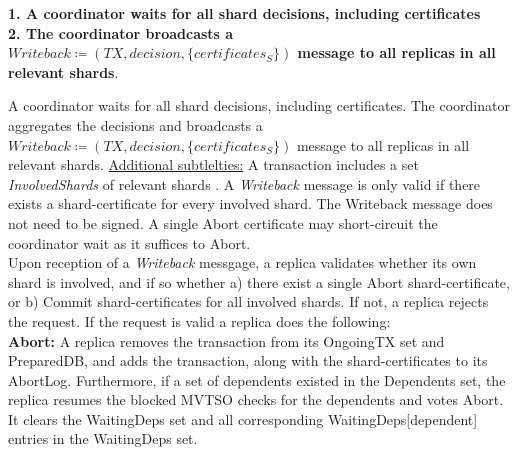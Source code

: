 \textbf{1. A coordinator waits for all shard decisions, including certificates}\\
\textbf{2. The coordinator broadcasts a $Writeback \coloneqq (TX, decision, \{certificates_S \} )$ message to all replicas in all relevant shards}.\\


A coordinator waits for all shard decisions, including certificates. The coordinator aggregates the decisions and broadcasts a $Writeback \coloneqq (TX, decision, \{certificates_S \} )$ message to all replicas in all relevant shards.
\underline{Additional subtlelties:} A transaction includes a set \textit{InvolvedShards} of relevant shards . A \textit{Writeback} message is only valid if there exists a shard-certificate for every involved shard. The Writeback message does not need to be signed. A single Abort certificate may short-circuit the coordinator wait as it suffices to Abort.\\





Upon reception of a \textit{Writeback} messgage, a replica validates whether its own shard is involved, and if so whether a) there exist a single Abort shard-certificate, or b) Commit shard-certificates for all involved shards. If not, a replica rejects the request. If the request is valid a replica does the following:\\

\textbf{Abort:} A replica removes the transaction from its OngoingTX set and PreparedDB, and adds the transaction, along with the shard-certificates to its AbortLog. Furthermore, if a set of dependents existed in the Dependents set, the replica resumes the blocked MVTSO checks for the dependents and votes Abort. It clears the WaitingDeps set and all corresponding WaitingDeps[dependent] entries in the WaitingDeps set.
\\


